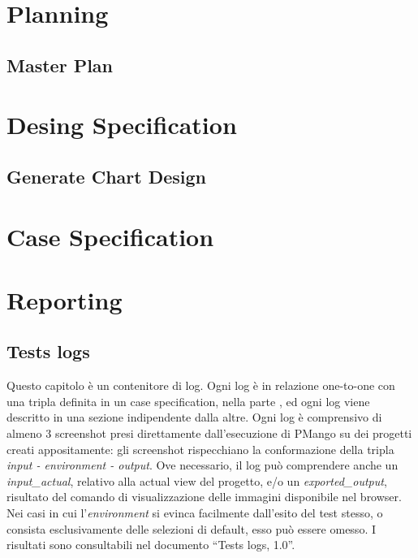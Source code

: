 \documentclass[a4paper, 12pt]{report}
\begin{document}
\tableofcontents

\part{Planning}

\chapter{Master Plan}
\label{chap:master_plan}


\part{Desing Specification}
\label{part:DesignSpecification}
\chapter{Generate Chart Design}
\label{chap:generateChartDesingSpecification}


\part{Case Specification}
\label{part:CaseSpecification}




\part{Reporting}
\label{part:reporting}


\chapter{Tests logs}
\label{chap:testsLogs}
Questo capitolo \`e un contenitore di log. Ogni log \`e in relazione one-to-one
con una tripla definita in un case specification, nella parte
\ref{part:CaseSpecification}, ed ogni log viene descritto in una sezione
indipendente dalla altre.
Ogni log \`e comprensivo di almeno 3 screenshot presi direttamente dall'esecuzione di PMango
su dei progetti creati appositamente: gli screenshot rispecchiano la conformazione della tripla \emph{input - environment - output}.
Ove necessario, il log pu\`o comprendere anche un \emph{input\_actual}, relativo alla actual view del progetto, e/o un \emph{exported\_output}, risultato del comando di visualizzazione delle immagini disponibile nel browser.
Nei casi in cui l'\emph{environment} si evinca facilmente dall'esito del test stesso, o consista esclusivamente delle selezioni di default, esso pu\`o essere omesso.
I risultati sono consultabili nel documento ``Tests logs, 1.0''.


\end{document}
